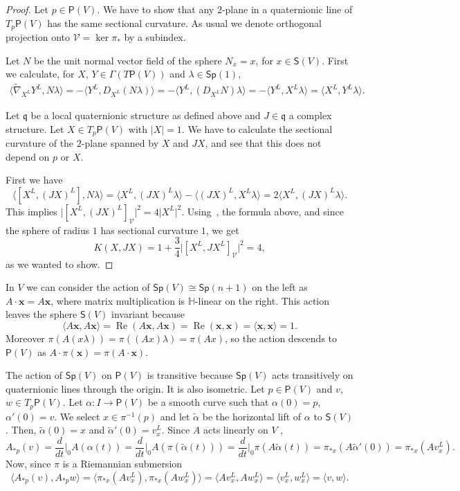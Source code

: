 \documentclass[12pt, a4paper]{amsart}
\newcommand{\g}{\mathfrak}
\renewcommand{\H}{\mathbb{H}}
\renewcommand{\Re}{\operatorname{Re}}
\newcommand{\Sp}{\mathsf{Sp}}
\theoremstyle{remark}
\begin{document}
\begin{proof}
Let $p\in\mathsf{P}(V)$.
We have to show that any $2$-plane in a quaternionic line of $T_p\mathsf{P}(V)$ has the same sectional curvature.
As usual we denote orthogonal projection onto $\mathcal{V}=\ker\pi_*$ by a subindex.

Let $N$ be the unit normal vector field of the sphere $N_x=x$, for $x\in\mathsf{S}(V)$.
First we calculate, for $X$, $Y\in\Gamma(T\mathsf{P}(V))$ and $\lambda\in\Sp(1)$,
\[
\begin{aligned}
\langle \tilde{\nabla}_{X^L} Y^L,N\lambda\rangle
=-\langle Y^L,D_{X^L}(N\lambda)\rangle
=-\langle Y^L,(D_{X^L}N)\lambda\rangle
=-\langle Y^L,X^L \lambda\rangle
=\langle X^L,Y^L \lambda\rangle.
\end{aligned}
\]

Let $\g{q}$ be a local quaternionic structure as defined above and $J\in\g{q}$ a complex structure.
Let $X\in T_p\mathsf{P}(V)$ with $\lvert X\rvert=1$. 
We have to calculate the sectional curvature of the $2$-plane spanned by $X$ and $JX$, and see that this does not depend on $p$ or $X$.

First we have 
\[
\langle[X^L,(JX)^L],N\lambda\rangle
=\langle X^L,(JX)^L\lambda\rangle-\langle(JX)^L,X^L\lambda\rangle
=2\langle X^L,(JX)^L\lambda\rangle.
\]
This implies $\lvert[X^L,(JX)^L]_\mathcal{V}\rvert^2=4\lvert X^L\rvert^2$.
Using~\cite[Corollary~1]{ONeill}, the formula above, and since the sphere of radius $1$ has sectional curvature $1$, we get
\[
K(X, JX)
=1+\frac{3}{4}\bigl\lvert[X^L,JX^L]_\mathcal{V}\bigr\rvert^2
=4,
\]
as we wanted to show.
\end{proof}

In $V$ we can consider the action of $\Sp(V)\cong\Sp(n+1)$ on the left as
$A\cdot\mathbf{x}=A\mathbf{x}$, where matrix multiplication is $\H$-linear on the right.
This action leaves the sphere $\mathsf{S}(V)$ invariant because
\[
\langle A\mathbf{x},A\mathbf{x}\rangle
=\Re(A\mathbf{x},A\mathbf{x})
=\Re(\mathbf{x},\mathbf{x})
=\langle \mathbf{x},\mathbf{x}\rangle=1.
\]
Moreover $\pi(A(x\lambda))=\pi((Ax)\lambda)=\pi(Ax)$, so the action descends to $\mathsf{P}(V)$ as $A\cdot\pi(\mathbf{x})=\pi(A\cdot\mathbf{x})$.

The action of $\Sp(V)$ on $\mathsf{P}(V)$ is transitive because $\Sp(V)$ acts transitively on quaternionic lines through the origin.
It is also isometric.
Let $p\in\mathsf{P}(V)$ and $v$, $w\in T_p\mathsf{P}(V)$.
Let $\alpha\colon I\to\mathsf{P}(V)$ be a smooth curve such that $\alpha(0)=p$, $\alpha'(0)=v$.
We select $x\in\pi^{-1}(p)$ and let $\tilde{\alpha}$ be the horizontal lift of $\alpha$ to $\mathsf{S}(V)$.
Then, $\tilde{\alpha}(0)=x$ and $\tilde{\alpha}'(0)=v_x^L$.
Since $A$ acts linearly on $V$ ,
\[
A_{*p}(v)
=\frac{d}{dt}\Big\vert_0 A(\alpha(t))
=\frac{d}{dt}\Big\vert_0 A(\pi(\tilde{\alpha}(t)))
=\frac{d}{dt}\Big\vert_0 \pi(A\tilde{\alpha}(t))
=\pi_{*x}(A\tilde{\alpha}'(0))
=\pi_{*x}(Av_x^L).
\]
Now, since $\pi$ is a Riemannian submersion
\[
\langle A_{*p}(v),A_{*p}w\rangle
=\langle \pi_{*x}(A v_x^L),\pi_{*x}(A w_x^L)\rangle
=\langle A v_x^L,A w_x^L\rangle
=\langle v_x^L,w_x^L\rangle
=\langle v,w\rangle.
\]
\end{document}
